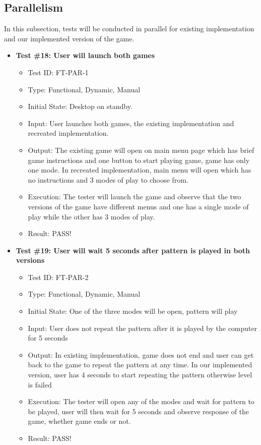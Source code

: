 \documentclass[12pt, titlepage]{article}
\begin{document}
\subsection{Parallelism}
In this subsection, tests will be conducted in parallel for existing implementation and our implemented version of the game.

\begin{itemize}

\item \textbf{Test \#18: User will launch both games }
\begin{itemize}
\item Test ID: FT-PAR-1
\item Type: Functional, Dynamic, Manual 		
\item Initial State: Desktop on standby.					
\item Input: User launches both games, the existing implementation and recreated implementation. 	
\item Output: The existing game will open on main menu page which has brief game instructions and one button to start playing game, game has only one mode. In recreated implementation, main menu will open which has no instructions and 3 modes of play to choose from.
\item Execution: The tester will launch the game and observe that the two versions of the game have different menus and one has a single mode of play while the other has 3 modes of play.
\item Result: PASS!
\end{itemize}

\item \textbf{Test \#19: User will wait 5 seconds after pattern is played in both versions }
\begin{itemize}
\item Test ID: FT-PAR-2
\item Type: Functional, Dynamic, Manual 		
\item Initial State: One of the three modes will be open, pattern will play					
\item Input: User does not repeat the pattern after it is played by the computer for 5 seconds	
\item Output: In existing implementation, game does not end and user can get back to the game to repeat the pattern at any time. In our implemented version, user has 4 seconds to start repeating the pattern otherwise level is failed				
\item Execution: The tester will open any of the modes and wait for pattern to be played, user will then wait for 5 seconds and observe response of the game, whether game ends or not.
\item Result: PASS!
\end{itemize}


\end{itemize}
\end{document}
